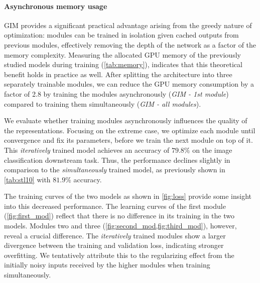 \documentclass{article}
\begin{document}
\begin{figure*}[t]
    \centering
        \hfill
        \hfill
    \caption{Training curves for optimizing all modules \textit{simultaneously} (blue) or \textit{iteratively}, one at a time (red). While there is no difference in the training methods for the first module (\textbf{a}), later modules (\textbf{b, c}) start out with a lower loss and tend to overfit more when trained iteratively on top of already converged modules. }
    \label{fig:loss}
\end{figure*}


\paragraph{Asynchronous memory usage}
GIM provides a significant practical advantage arising from the greedy nature of optimization: modules can be trained in isolation given cached outputs from previous modules, effectively removing the depth of the network as a factor of the memory complexity. Measuring the allocated GPU memory of the previously studied models during training (\cref{tab:memory}), indicates that this theoretical benefit holds in practice as well. After splitting the architecture into three separately trainable modules, we can reduce the GPU memory consumption by a factor of 2.8 by training the modules asynchronously (\textit{GIM - 1st module}) compared to training them simultaneously (\textit{GIM - all modules}).

We evaluate whether training modules asynchronously influences the quality of the representations. Focusing on the extreme case, we optimize each module until convergence and fix its parameters, before we train the next module on top of it. This \textit{iteratively} trained model achieves an accuracy of $79.8\%$ on the image classification downstream task. Thus, the performance declines slightly in comparison to the \textit{simultaneously} trained model, as previously shown in \cref{tab:stl10} with $81.9\%$ accuracy. 

The training curves of the two models as shown in \cref{fig:loss} provide some insight into this decreased performance. The learning curves of the first module (\cref{fig:first_mod}) reflect that there is no difference in its training in the two models. Modules two and three (\cref{fig:second_mod,fig:third_mod}), however, reveal a crucial difference. The \textit{iteratively} trained modules show a larger divergence between the training and validation loss, indicating stronger overfitting. We tentatively attribute this to the regularizing effect from the initially noisy inputs received by the higher modules when training simultaneously. 
\end{document}
